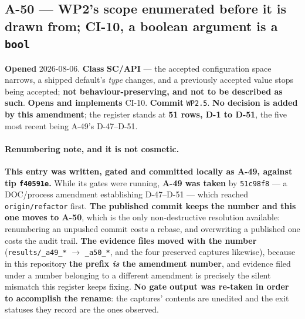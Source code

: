 \documentclass[
  10pt,
]{article}
\begin{document}
\hypertarget{a-50}{%
\subsection{A-50 --- WP2's scope enumerated before it is drawn from; CI-10, a boolean argument is a \texttt{bool}}\label{a-50}}

\textbf{Opened} 2026-08-06. \textbf{Class} \textbf{SC/API} --- the accepted configuration space narrows, a shipped default's \emph{type} changes, and a previously accepted value stops being accepted; \textbf{not behaviour-preserving, and not to be described as such}. \textbf{Opens and implements} CI-10. \textbf{Commit} \texttt{WP2.5}. \textbf{No decision is added by this amendment}; the register stands at \textbf{51 rows, D-1 to D-51}, the five most recent being A-49's D-47--D-51.

\paragraph{Renumbering note, and it is not cosmetic.}
\textbf{This entry was written, gated and committed locally as A-49, against tip \texttt{f40591e}.} While its gates were running, \textbf{A-49 was taken} by \texttt{51c98f8} --- a DOC/process amendment establishing D-47--D-51 --- which reached \texttt{origin/refactor} first. \textbf{The published commit keeps the number and this one moves to A-50}, which is the only non-destructive resolution available: renumbering an unpushed commit costs a rebase, and overwriting a published one costs the audit trail. \textbf{The evidence files moved with the number} (\texttt{results/\allowbreak{}\_a49\_*} $\to$ \texttt{\_a50\_*}, and the four preserved captures likewise), because in this repository \textbf{the prefix \emph{is} the amendment number}, and evidence filed under a number belonging to a different amendment is precisely the silent mismatch this register keeps fixing. \textbf{No gate output was re-taken in order to accomplish the rename}: the captures' contents are unedited and the exit statuses they record are the ones observed.
\end{document}
